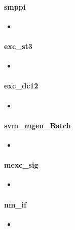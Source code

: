 \documentclass[12pt]{article}
\begin{document}
\paragraph{smppi}
	\begin{itemize}
		\item  
	\end{itemize}
\paragraph{exc\_st3}
	\begin{itemize}
		\item 
	\end{itemize}

\paragraph{exc\_dc12}
	\begin{itemize}
		\item 
	\end{itemize}
\paragraph{svm\_mgen\_Batch}
	\begin{itemize}
		\item 
	\end{itemize}

\paragraph{mexc\_sig}
	\begin{itemize}
		\item  
	\end{itemize}

\paragraph{nm\_if}
	\begin{itemize}
		\item 
	\end{itemize}
\end{document}

